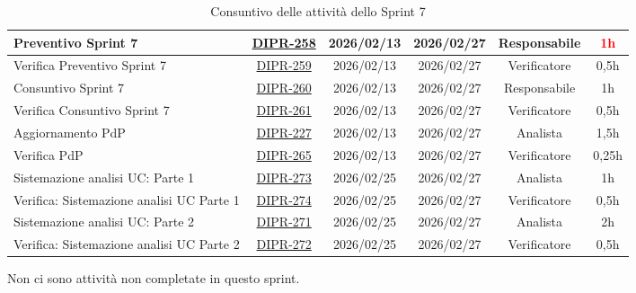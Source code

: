 \documentclass[a4paper,12pt]{article}
\begin{document}
\begin{table}[H]
\begin{adjustwidth}{-4cm}{-4cm}
\begin{spacing}{1}
\begin{tabular}{|p{4cm}|c|c|c|c|c|}
        \hline
        Preventivo Sprint 7 & \href{https://7zpus.atlassian.net/browse/DIPR-258}{DIPR-258} & 2026/02/13 & 2026/02/27 & Responsabile & \textcolor{red}{1h} \\
        \hline
        Verifica Preventivo Sprint 7 & \href{https://7zpus.atlassian.net/browse/DIPR-259}{DIPR-259} & 2026/02/13 & 2026/02/27 & Verificatore & 0,5h \\
        \hline
        Consuntivo Sprint 7 & \href{https://7zpus.atlassian.net/browse/DIPR-260}{DIPR-260} & 2026/02/13 & 2026/02/27 & Responsabile & 1h \\
        \hline
        Verifica Consuntivo Sprint 7 & \href{https://7zpus.atlassian.net/browse/DIPR-261}{DIPR-261} & 2026/02/13 & 2026/02/27 & Verificatore & 0,5h \\
        \hline
        Aggiornamento PdP & \href{https://7zpus.atlassian.net/browse/DIPR-227}{DIPR-227} & 2026/02/13 & 2026/02/27 & Analista & \textcolor{green!50!black}{1,5h} \\
        \hline
        Verifica PdP & \href{https://7zpus.atlassian.net/browse/DIPR-265}{DIPR-265} & 2026/02/13 & 2026/02/27 & Verificatore & \textcolor{green!50!black}{0,25h} \\
        \hline
        Sistemazione analisi UC: Parte 1 & \href{https://7zpus.atlassian.net/browse/DIPR-273}{DIPR-273} & 2026/02/25 & 2026/02/27 & Analista & 1h \\
        \hline
        Verifica: Sistemazione analisi UC Parte 1 & \href{https://7zpus.atlassian.net/browse/DIPR-274}{DIPR-274} & 2026/02/25 & 2026/02/27 & Verificatore & 0,5h \\
        \hline
        Sistemazione analisi UC: Parte 2 & \href{https://7zpus.atlassian.net/browse/DIPR-271}{DIPR-271} & 2026/02/25 & 2026/02/27 & Analista & 2h \\
        \hline
        Verifica: Sistemazione analisi UC Parte 2 & \href{https://7zpus.atlassian.net/browse/DIPR-272}{DIPR-272} & 2026/02/25 & 2026/02/27 & Verificatore & 0,5h \\
        \hline

    \end{tabular}
    \end{spacing}
    \caption{Consuntivo delle attività dello Sprint 7}
    \end{adjustwidth}
\end{table}

Non ci sono attività non completate in questo sprint.
\end{document}
